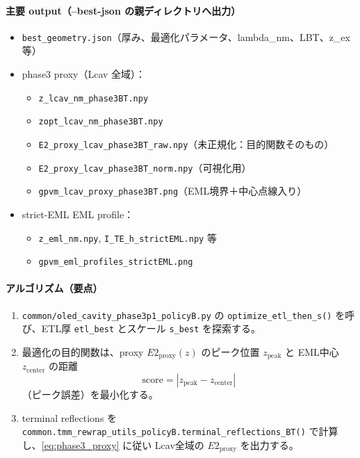 \documentclass[a4paper,11pt]{jsarticle} %
\begin{document}
\paragraph{主要 output（--best-json の親ディレクトリへ出力）}
\begin{itemize}
\item \texttt{best\_geometry.json}（厚み、最適化パラメータ、lambda\_nm、LBT、z\_ex 等）
\item phase3 proxy（Lcav 全域）：
  \begin{itemize}
  \item \texttt{z\_lcav\_nm\_phase3BT.npy}
  \item \texttt{zopt\_lcav\_nm\_phase3BT.npy}
  \item \texttt{E2\_proxy\_lcav\_phase3BT\_raw.npy}（未正規化：目的関数そのもの）
  \item \texttt{E2\_proxy\_lcav\_phase3BT\_norm.npy}（可視化用）
  \item \texttt{gpvm\_lcav\_proxy\_phase3BT.png}（EML境界＋中心点線入り）
  \end{itemize}
\item strict-EML EML profile：
  \begin{itemize}
  \item \texttt{z\_eml\_nm.npy}, \texttt{I\_TE\_h\_strictEML.npy} 等
  \item \texttt{gpvm\_eml\_profiles\_strictEML.png}
  \end{itemize}
\end{itemize}

\paragraph{アルゴリズム（要点）}
\begin{enumerate}
\item \texttt{common/oled\_cavity\_phase3p1\_policyB.py} の \texttt{optimize\_etl\_then\_s()} を呼び、ETL厚 \texttt{etl\_best} とスケール \texttt{s\_best} を探索する。
\item 最適化の目的関数は、proxy $E2_{\mathrm{proxy}}(z)$ のピーク位置 $z_{\mathrm{peak}}$ と EML中心 $z_{\mathrm{center}}$ の距離
\[
\mathrm{score}=\left|z_{\mathrm{peak}}-z_{\mathrm{center}}\right|
\]
（ピーク誤差）を最小化する。
\item terminal reflections を \texttt{common.tmm\_rewrap\_utils\_policyB.terminal\_reflections\_BT()} で計算し、\eqref{eq:phase3_proxy} に従い Lcav全域の $E2_{\mathrm{proxy}}$ を出力する。
\end{enumerate}
\end{document}
